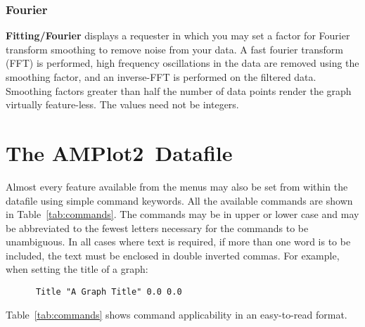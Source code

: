 \documentclass{report}
\newcommand{\amplot}{{\bf AMPlot2}}
\begin{document}
\subsection{Fourier}
{\bf Fitting/Fourier}  
displays a requester in which you may set a 
factor for Fourier transform smoothing to remove noise from your data.
A fast fourier transform (FFT) is 
performed, high frequency oscillations in the data are removed using the smoothing 
factor, and an inverse-FFT is performed on the filtered data.
Smoothing factors greater 
than half the number of data points render the graph virtually feature-less.
The values need not be integers.




\chapter{The \amplot\ Datafile}
\label{ch:datafile}
Almost every feature available from the menus may also be set from within 
the datafile using simple command keywords. All the available commands are shown 
in Table~\ref{tab:commands}. 
The commands may be in upper or lower case and may be abbreviated to the 
fewest letters necessary for the commands to be unambiguous. In all cases 
where text is required, if more than one word is to be included,
the text must be enclosed in double inverted commas. For example, when 
setting the title of a graph:
\begin{verbatim}
      Title "A Graph Title" 0.0 0.0
\end{verbatim}

Table~\ref{tab:commands} 
shows command applicability in an easy-to-read format.
\end{document}
